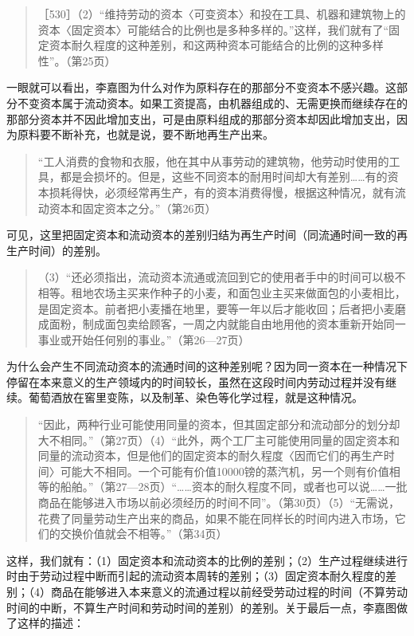 \begin{quote}{［530］（2）“维持劳动的资本〈可变资本〉和投在工具、机器和建筑物上的资本〈固定资本〉可能结合的比例也是多种多样的。”这样，我们就有了“固定资本耐久程度的这种差别，和这两种资本可能结合的比例的这种多样性”。（第25页）}\end{quote}

一眼就可以看出，李嘉图为什么对作为原料存在的那部分不变资本不感兴趣。这部分不变资本属于流动资本。如果工资提高，由机器组成的、无需更换而继续存在的那部分资本并不因此增加支出，可是由原料组成的那部分资本却因此增加支出，因为原料要不断补充，也就是说，要不断地再生产出来。

\begin{quote}{“工人消费的食物和衣服，他在其中从事劳动的建筑物，他劳动时使用的工具，都是会损坏的。但是，这些不同资本的耐用时间却大有差别……有的资本损耗得快，必须经常再生产，有的资本消费得慢，根据这种情况，就有流动资本和固定资本之分。”（第26页）}\end{quote}

可见，这里把固定资本和流动资本的差别归结为再生产时间（同流通时间一致的再生产时间）的差别。

\begin{quote}{（3）“还必须指出，流动资本流通或流回到它的使用者手中的时间可以极不相等。租地农场主买来作种子的小麦，和面包业主买来做面包的小麦相比，是固定资本。前者把小麦播在地里，要等一年以后才能收回；后者把小麦磨成面粉，制成面包卖给顾客，一周之内就能自由地用他的资本重新开始同一事业或开始任何别的事业。”（第26—27页）}\end{quote}

为什么会产生不同流动资本的流通时间的这种差别呢？因为同一资本在一种情况下停留在本来意义的生产领域内的时间较长，虽然在这段时间内劳动过程并没有继续。葡萄酒放在窖里变陈，以及制革、染色等化学过程，就是这种情况。

\begin{quote}{“因此，两种行业可能使用同量的资本，但其固定部分和流动部分的划分却大不相同。”（第27页）（4）“此外，两个工厂主可能使用同量的固定资本和同量的流动资本，但是他们的固定资本的耐久程度〈因而它们的再生产时间〉可能大不相同。一个可能有价值10000镑的蒸汽机，另一个则有价值相等的船舶。”（第27—28页）“……资本的耐久程度不同，或者也可以说……一批商品在能够进入市场以前必须经历的时间不同”。（第30页）（5）“无需说，花费了同量劳动生产出来的商品，如果不能在同样长的时间内进入市场，它们的交换价值就会不相等。”（第34页）}\end{quote}

这样，我们就有：（1）固定资本和流动资本的比例的差别；（2）生产过程继续进行时由于劳动过程中断而引起的流动资本周转的差别；（3）固定资本耐久程度的差别；（4）商品在能够进入本来意义的流通过程以前经受劳动过程的时间（不算劳动时间的中断，不算生产时间和劳动时间的差别）的差别。关于最后一点，李嘉图做了这样的描述：

